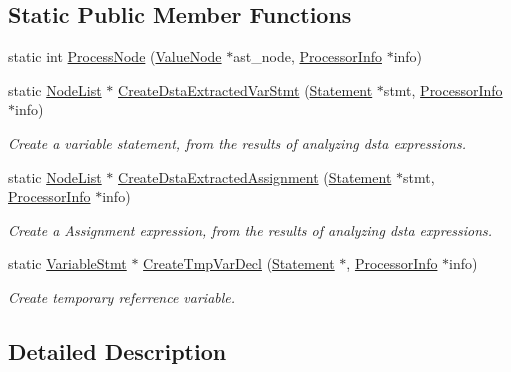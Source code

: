\subsection*{Static Public Member Functions}
\begin{DoxyCompactItemize}
\item 
static int \hyperlink{classmocha_1_1_dsta_processor_aa9e05aa90c50ae41867bcd90b72f9127}{ProcessNode} (\hyperlink{classmocha_1_1_value_node}{ValueNode} $\ast$ast\_\-node, \hyperlink{classmocha_1_1_processor_info}{ProcessorInfo} $\ast$info)
\item 
static \hyperlink{classmocha_1_1_node_list}{NodeList} $\ast$ \hyperlink{classmocha_1_1_dsta_processor_a9323e86b8a5d1857db8a1e186ee4fd3f}{CreateDstaExtractedVarStmt} (\hyperlink{classmocha_1_1_statement}{Statement} $\ast$stmt, \hyperlink{classmocha_1_1_processor_info}{ProcessorInfo} $\ast$info)
\begin{DoxyCompactList}\small\item\em Create a variable statement, from the results of analyzing dsta expressions. \end{DoxyCompactList}\item 
static \hyperlink{classmocha_1_1_node_list}{NodeList} $\ast$ \hyperlink{classmocha_1_1_dsta_processor_a912f770394af3067ab097df45d9b4d7c}{CreateDstaExtractedAssignment} (\hyperlink{classmocha_1_1_statement}{Statement} $\ast$stmt, \hyperlink{classmocha_1_1_processor_info}{ProcessorInfo} $\ast$info)
\begin{DoxyCompactList}\small\item\em Create a Assignment expression, from the results of analyzing dsta expressions. \end{DoxyCompactList}\item 
static \hyperlink{classmocha_1_1_variable_stmt}{VariableStmt} $\ast$ \hyperlink{classmocha_1_1_dsta_processor_a78c733b14ee5164d619885b75e0fecd1}{CreateTmpVarDecl} (\hyperlink{classmocha_1_1_statement}{Statement} $\ast$, \hyperlink{classmocha_1_1_processor_info}{ProcessorInfo} $\ast$info)
\begin{DoxyCompactList}\small\item\em Create temporary referrence variable. \end{DoxyCompactList}\end{DoxyCompactItemize}


\subsection{Detailed Description}


